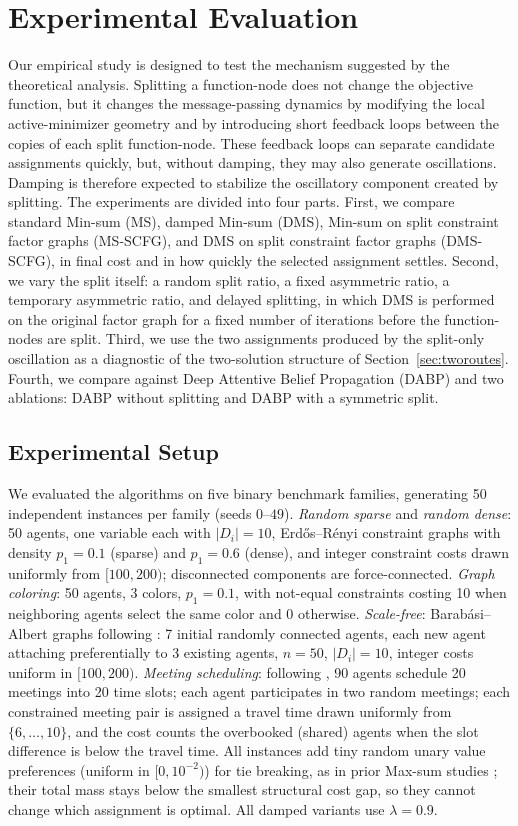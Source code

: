 \section{Experimental Evaluation}
\label{Sec:experiments}
Our empirical study is designed to test the mechanism suggested by the
theoretical analysis.  Splitting a function-node does not change the objective
function, but it changes the message-passing dynamics by modifying the local
active-minimizer geometry and by introducing short feedback loops between the
copies of each split function-node.  These feedback loops can separate
candidate assignments quickly, but, without damping, they may also generate
oscillations.  Damping is therefore expected to stabilize the oscillatory
component created by splitting.
The experiments are divided into four parts.  First, we compare standard
Min-sum (MS), damped Min-sum (DMS), Min-sum on split constraint factor
graphs (MS-SCFG), and DMS on split constraint factor graphs (DMS-SCFG),
in final cost and in how quickly the selected assignment settles.
Second, we vary the split itself: a random split ratio, a fixed asymmetric
ratio, a temporary asymmetric ratio, and delayed splitting, in which DMS
is performed on the original factor graph for a fixed number of iterations
before the function-nodes are split.  Third, we use the two assignments
produced by the split-only oscillation as a diagnostic of the two-solution
structure of Section~\ref{sec:tworoutes}.  Fourth, we compare against Deep
Attentive Belief Propagation (DABP) and two ablations: DABP without
splitting and DABP with a symmetric split.
\subsection{Experimental Setup}
We evaluated the algorithms on five binary benchmark families, generating 50
independent instances per family (seeds $0$--$49$).
\emph{Random sparse} and \emph{random dense}: 50 agents, one variable each
with $|D_i| = 10$, Erd\H{o}s--R\'enyi constraint graphs with density $p_1 = 0.1$
(sparse) and $p_1 = 0.6$ (dense), and integer constraint costs drawn uniformly
from $[100, 200)$; disconnected components are force-connected.
\emph{Graph coloring}: 50 agents, 3 colors, $p_1 = 0.1$, with not-equal
constraints costing 10 when neighboring agents select the same color and 0
otherwise.
\emph{Scale-free}: Barab\'asi--Albert graphs following \citet{CohenGZ20}: 7
initial randomly connected agents, each new agent attaching preferentially to 3
existing agents, $n = 50$, $|D_i| = 10$, integer costs uniform in $[100, 200)$.
\emph{Meeting scheduling}: following \citet{CohenGZ20}, 90 agents schedule 20
meetings into 20 time slots; each agent participates in two random meetings;
each constrained meeting pair is assigned a travel time drawn uniformly from
$\{6, \ldots, 10\}$, and the cost counts the overbooked (shared) agents when
the slot difference is below the travel time.
All instances add tiny random unary value preferences (uniform in
$[0, 10^{-2})$) for tie breaking, as in prior Max-sum studies
\cite{FarinelliRPJ08}; their total mass stays below the smallest structural
cost gap, so they cannot change which assignment is optimal.
All damped variants use $\lambda = 0.9$.

